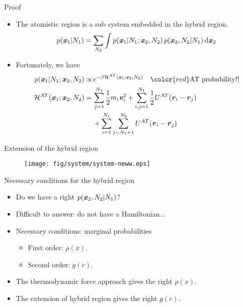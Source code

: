 \documentclass{beamer}
\newcommand{\redc}[1]{{\color{red} #1}}
\newcommand{\bluec}[1]{{\color{blue} #1}}
\renewcommand{\v}[1]{\textbf{\textit{#1}}}
\renewcommand{\d}[1]{\textrm{#1}}
\begin{document}
\begin{frame}{Proof}
  \begin{itemize}
  \item <1-> The atomistic region is a sub system embedded in the
    hybrid region.
    \begin{align*}
      p(\v x_1 | N_1) = \sum_{N_2}\int
      p(\v x_1 | N_1; \v x_2, N_2) \,
      p(\v x_2, N_2 | N_1)
      \,\d d\v x_2
    \end{align*}
  \item <2-> Fortunately, we have
    \begin{align*}
      p(\v x_1 | N_1; \v x_2, N_2)
      \propto &\,
      e^{-\beta\mathcal H^{AT}(\v x_1; \v x_2, N_2)}
      \quad \redc{\textrm{AT probability!!}}\\
      \mathcal H^{{AT}}(\v x_1; \v x_2, N_2) = &\,
      \sum_{j=1}^{N_1}\frac12 m_i\v v_i^2 + 
      \sum_{i,j=1}^{N_1}\frac12 U^{{AT}}(\v r_i - \v r_j) \\
      &\,+ 
      \sum_{i=1}^{N_1}\sum_{j=N_1+1}^{N_2} U^{{AT}}(\v r_i - \v r_j) 
    \end{align*}
  \end{itemize}
\end{frame}


\begin{frame}{Extension of the hybrid region}
  \begin{figure}
    \centering 
    \texttt{[image: fig/system/system-neww.eps]}
  \end{figure}
\end{frame} 


\begin{frame}{Necessary conditions for the hybrid region}
  \begin{itemize}
    \vfill
  \item <1-> Do we have a right $p(\v x_2, N_2 | N_1)$?
    \vfill
  \item <2-> Difficult to answer: \bluec{do {not} have a Hamiltonian...}
    \vfill
  \item <3-> Necessary conditions: \redc{marginal probabilities}\\
    \vfill
    \begin{itemize}
    \item First order: \redc{$\rho(x)$}.
    \vfill
    \item Second order: \redc{$g(r)$}.
    \end{itemize}
    \vfill
  \item <4-> The thermodynamic force approach  gives the right \redc{$\rho(x)$}.
    \vfill
  \item <5-> The extension of hybrid region gives the right \redc{$g(r)$}.
    \vfill
  \end{itemize}
\end{frame}
\end{document}
